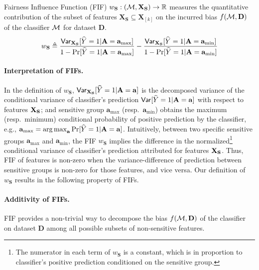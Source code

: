 \documentclass[10pt]{article}
\begin{document}
	\begin{definition}
		Fairness Influence Function (FIF) $ w_{\mathbf{S}}: (\mathcal{M}, \mathbf{X}_{\mathbf{S}}) \rightarrow \mathbb{R} $ measures the quantitative contribution of the subset of features $ \mathbf{X}_{\mathbf{S}} \subseteq \mathbf{X}_{[k]}$ on the incurred bias $ f(\mathcal{M}, \mathbf{D}) $ of the classifier $ \mathcal{M} $ for dataset $\mathbf{D}$. 
		\begin{equation}\label{eq:fif_decompose}
			w_{\mathbf{S}}  \triangleq \frac{\mathsf{Var}_{\mathbf{X}_{\mathbf{S}}}[\widehat{Y} = 1|\mathbf{A} = \mathbf{a}_{\max}]}{1 - \Pr[\widehat{Y} = 1 |  \mathbf{A} = \mathbf{a}_{\max}]} - \frac{\mathsf{Var}_{\mathbf{X}_{\mathbf{S}}}[\widehat{Y} = 1|\mathbf{A} = \mathbf{a}_{\min}] }{1 - \Pr[\widehat{Y} = 1 |  \mathbf{A} = \mathbf{a}_{\min}]}
		\end{equation}
	
	\end{definition}	
		
	\paragraph{Interpretation of FIFs.} In the definition of $ w_{\mathbf{S}} $, $ \mathsf{Var}_{\mathbf{X}_{\mathbf{S}}}[\widehat{Y} = 1|\mathbf{A} = \mathbf{a}] $ is the decomposed variance  of the conditional variance of classifier's prediction $ \mathsf{Var}[\widehat{Y} = 1|\mathbf{A} = \mathbf{a}] $ with respect to features $ \mathbf{X}_{\mathbf{S}} $; and  sensitive group $ \mathbf{a}_{\max} $ (resp.\ $ \mathbf{a}_{\min} $) obtains the maximum (resp.\ minimum) conditional probability of positive prediction by the classifier, e.g., $ \mathbf{a}_{\max} = \operatorname*{arg\,max}_{\mathbf{a}} \Pr[\widehat{Y} = 1 |  \mathbf{A} = \mathbf{a}] $. Intuitively, between two specific sensitive groups $ \mathbf{a}_{\max} $ and $ \mathbf{a}_{\min} $, the FIF $ w_{\mathbf{S}} $ implies the difference in the normalized\footnote{The numerator in each term of $ w_{\mathbf{S}} $ is a constant, which is in proportion to classifier's positive prediction conditioned on the sensitive group.} conditional variance of classifier's prediction attributed for features  $ \mathbf{X}_{\mathbf{S}} $. Thus, FIF of features is non-zero when the variance-difference of prediction between sensitive groups is non-zero for those features, and vice versa. Our definition of $ w_{\mathbf{S}} $ results in the following property of FIFs.
	
	
	\paragraph{Additivity of FIFs.} FIF provides a non-trivial way to decompose the bias $ f(\mathcal{M}, \mathbf{D}) $ of the classifier on dataset $ \mathbf{D} $ among all possible subsets of non-sensitive features. 
	
\end{document}
